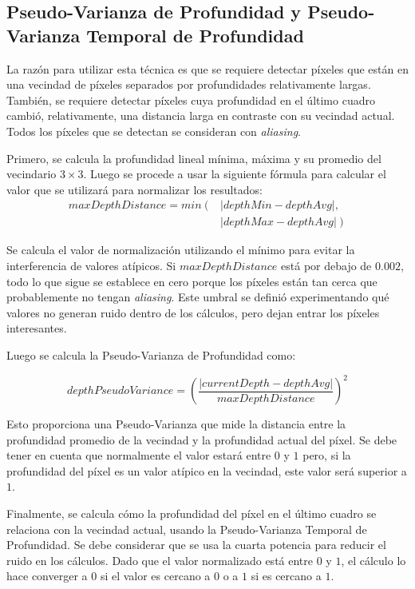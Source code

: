 \documentclass[pregrado]{tesis-usb} %
\begin{document}
\subsection{Pseudo-Varianza de Profundidad y Pseudo-Varianza Temporal de Profundidad}
La razón para utilizar esta técnica es que se requiere detectar píxeles que están en una vecindad de píxeles separados por profundidades relativamente largas. También, se requiere detectar píxeles cuya profundidad en el último cuadro cambió, relativamente, una distancia larga en contraste con su vecindad actual. Todos los píxeles que se detectan se consideran con \textit{aliasing}.

Primero, se calcula la profundidad lineal mínima, máxima y su promedio del vecindario $3\times 3$. Luego se procede a usar la siguiente fórmula para calcular el valor que se utilizará para normalizar los resultados: 
\begin{equation} \label{eq:maxdepthdistance}
\begin{split} 
	maxDepthDistance = min \left( \right. & \left| depthMin-depthAvg \right|  ,   \\ 
	 &  \left.\left| depthMax-depthAvg\right| \right) 
\end{split} 
\end{equation}

Se calcula el valor de normalización utilizando el mínimo para evitar la interferencia de valores atípicos. Si $maxDepthDistance$ está por debajo de $0.002$, todo lo que sigue se establece en cero porque los píxeles están tan cerca que probablemente no tengan \textit{aliasing}. Este umbral se definió experimentando qué valores no generan ruido dentro de los cálculos, pero dejan entrar los píxeles interesantes.

Luego se calcula la Pseudo-Varianza de Profundidad como:

\begin{equation} \label{eq:depthpseudovariance}
	depthPseudoVariance = \left( \frac{\left|currentDepth-depthAvg\right|}{maxDepthDistance}\right)^2
\end{equation}

Esto proporciona una Pseudo-Varianza que mide la distancia entre la profundidad promedio de la vecindad y la profundidad actual del píxel. Se debe tener en cuenta que normalmente el valor estará entre $0$ y $1$ pero, si la profundidad del píxel es un valor atípico en la vecindad, este valor será superior a $1$.

Finalmente, se calcula cómo la profundidad del píxel en el último cuadro se relaciona con la vecindad actual, usando la Pseudo-Varianza Temporal de Profundidad. Se debe considerar que se usa la cuarta potencia para reducir el ruido en los cálculos. Dado que el valor normalizado está entre $0$ y $1$, el cálculo lo hace converger a $0$ si el valor es cercano a $0$ o a $1$ si es cercano a $1$.
\end{document}

